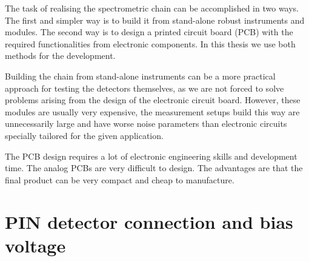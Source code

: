 \par
The task of realising the spectrometric chain can be accomplished in two ways. The first and simpler way is to build it from stand-alone robust instruments and modules. The second way is to design a printed circuit board (PCB) with the required functionalities from electronic components. In this thesis we use both methods for the development. 
\par
Building the chain from stand-alone instruments can be a more practical approach for testing the detectors themselves, as we are not forced to solve problems arising from the design of the electronic circuit board. However, these modules are usually very expensive, the measurement setups build this way are unnecessarily large and have worse noise parameters than electronic circuits specially tailored for the given application.
\par
The PCB design requires a lot of electronic engineering skills and development time. The analog PCBs are very difficult to design. The advantages are that the final product can be very compact and cheap to manufacture.



\section{PIN detector connection and bias voltage}
